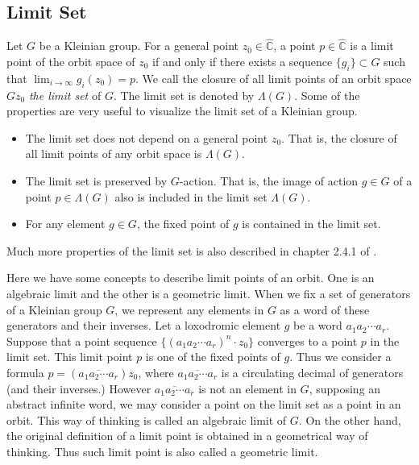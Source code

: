 \subsection{Limit Set}

Let $G$ be a Kleinian group.
For a general point $z_0 \in \hat{\mathbb{C}}$,
a point $p  \in \hat{\mathbb{C}}$ is a limit point 
of the orbit space of $z_0$ if and only if 
there exists a sequence $\{ g_i \} \subset G$ such that 
$\displaystyle \lim_{i\to\infty} g_i(z_0) = p$.
We call the closure of all limit points of an orbit space $Gz_0$ \textit{the limit set} of $G$.
The limit set is denoted by $\Lambda(G)$.
Some of the properties are very useful to visualize the limit set of a Kleinian group.
\begin{itemize}
\item The limit set does not depend on a general point $z_0$.  
That is, the closure of all limit points of any orbit space is $\Lambda(G)$.
\item The limit set is preserved by $G$-action.  That is,
the image of action $g\in G$ of a point $p\in \Lambda(G)$  
      also is included in the limit set $\Lambda(G)$.
\item For any element $g \in G$, the fixed point of $g$ is contained in the limit set.
\end{itemize}
Much more properties of the limit set is also described in chapter 2.4.1 of
\cite{marden_2016}.

Here we have some concepts to describe limit points of an orbit. 
One is an algebraic limit and the other is a geometric limit.
When we fix a set of generators of a Kleinian group $G$, we represent any elements in $G$ 
as a word of these generators and their inverses.
Let a loxodromic element $g$ be a word $a_1a_2\cdots a_r$.
Suppose that a point sequence $\{ (a_1a_2\cdots a_r)^n\cdot z_0 \}$ converges to a point $p$ in the limit set.
This limit point $p$ is one of the fixed points of $g$.
Thus we consider a formula $p = (\overline{a_1a_2\cdots a_r})z_0$, where $\overline{a_1a_2\cdots a_r}$
is a circulating decimal of generators (and their inverses.)
However $\overline{a_1a_2\cdots a_r}$ is not an element in $G$, supposing an abstract infinite word,
we may consider a point on the limit set as a point in an orbit.
This way of thinking is called an algebraic limit of $G$.
On the other hand, the original definition of a limit point is obtained in a geometrical way of thinking.
Thus such limit point is also called a geometric limit.

